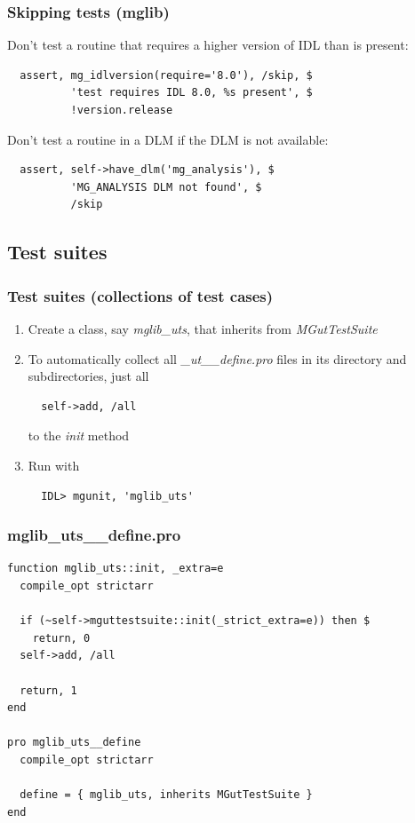 \documentclass[12pt, handout]{beamer}
\begin{document}
\begin{frame}[t, fragile]
  \frametitle{Skipping tests (mglib)}
Don't test a routine that requires a higher version of IDL than is present:
\begin{lstlisting}
  assert, mg_idlversion(require='8.0'), /skip, $
          'test requires IDL 8.0, %s present', $
          !version.release
\end{lstlisting}
Don't test a routine in a DLM if the DLM is not available:
\begin{lstlisting}
  assert, self->have_dlm('mg_analysis'), $
          'MG_ANALYSIS DLM not found', $
          /skip
\end{lstlisting}

\end{frame}

\subsection{Test suites}

\begin{frame}[t, fragile]
  \hypertarget{suites}{}
  \frametitle{Test suites (collections of test cases)}
  \begin{enumerate}
    \item Create a class, say {\em mglib\_uts}, that inherits from {\em MGutTestSuite}
    \item To automatically collect all {\em \_ut\_\_define.pro} files in its directory and subdirectories, just all
\begin{lstlisting}
  self->add, /all
\end{lstlisting}
to the {\em init} method
    \item Run with
\begin{lstlisting}
  IDL> mgunit, 'mglib_uts'
\end{lstlisting}
  \end{enumerate}
\end{frame}

\begin{frame}[fragile]
  \frametitle{mglib\_uts\_\_define.pro}
\begin{lstlisting}[basicstyle=\ttfamily\fontsize{10pt}{10pt}\selectfont]
function mglib_uts::init, _extra=e
  compile_opt strictarr

  if (~self->mguttestsuite::init(_strict_extra=e)) then $
    return, 0
  self->add, /all

  return, 1
end

pro mglib_uts__define
  compile_opt strictarr

  define = { mglib_uts, inherits MGutTestSuite }
end
\end{lstlisting}
\end{frame}
\end{document}
